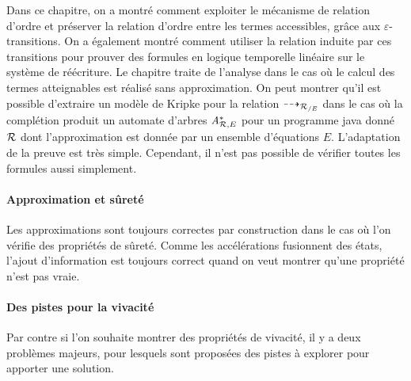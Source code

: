 Dans ce chapitre, on a montré comment
exploiter le mécanisme de relation d'ordre et préserver la relation d'ordre
entre les termes accessibles, grâce aux $\varepsilon$-transitions.
On a également montré comment utiliser la relation induite par ces transitions pour prouver des 
formules en logique temporelle linéaire sur le système de réécriture. Le chapitre traite de l'analyse 
dans le cas où le calcul des termes atteignables est réalisé sans approximation.
On peut montrer qu'il est possible d'extraire un modèle de Kripke pour la relation $\dashrightarrow_{\mathcal R_{/E}}$ 
dans le cas où la complétion produit un automate d'arbres ${\mathit A}_{\mathcal R,E}^*$ pour un programme java
donné $\mathcal R$ dont l'approximation est donnée par un ensemble d'équations $E$.
L'adaptation de la preuve est très simple. Cependant, il n'est pas possible de vérifier
toutes les formules aussi simplement.

\paragraph{Approximation et  sûreté}
Les approximations sont toujours correctes par construction dans le cas où l'on vérifie
des propriétés de sûreté. Comme les accélérations fusionnent des états,
l'ajout d'information est toujours correct quand on veut montrer qu'une propriété n'est pas
vraie.

\paragraph{Des pistes pour la vivacité}
Par contre si l'on souhaite montrer des propriétés de vivacité, il y a deux problèmes majeurs, pour lesquels
sont proposées des pistes à explorer pour apporter une solution.


